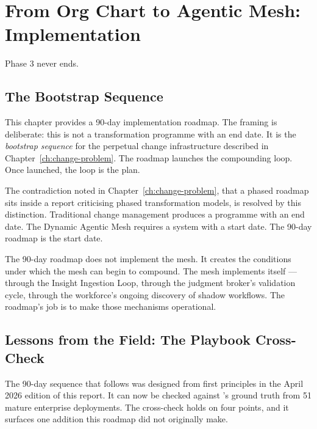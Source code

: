 \chapter{From Org Chart to Agentic Mesh: Implementation}
\label{ch:implementation}

\epigraph{Phase 3 never ends.}{}

\section{The Bootstrap Sequence}

This chapter provides a 90-day implementation roadmap. The framing is deliberate: this is not a transformation programme with an end date. It is the \emph{bootstrap sequence} for the perpetual change infrastructure described in Chapter~\ref{ch:change-problem}. The roadmap launches the compounding loop. Once launched, the loop is the plan.

The contradiction noted in Chapter~\ref{ch:change-problem}, that a phased roadmap sits inside a report criticising phased transformation models, is resolved by this distinction. Traditional change management produces a programme with an end date. The Dynamic Agentic Mesh requires a system with a start date. The 90-day roadmap is the start date.

\begin{keyinsight}
The 90-day roadmap does not implement the mesh. It creates the conditions under which the mesh can begin to compound. The mesh implements itself --- through the Insight Ingestion Loop, through the judgment broker's validation cycle, through the workforce's ongoing discovery of shadow workflows. The roadmap's job is to make those mechanisms operational.
\end{keyinsight}

\section{Lessons from the Field: The Playbook Cross-Check}

The 90-day sequence that follows was designed from first principles in the April 2026 edition of this report. It can now be checked against \textcite{Pereira2026Playbook}'s ground truth from 51 mature enterprise deployments. The cross-check holds on four points, and it surfaces one addition this roadmap did not originally make.

